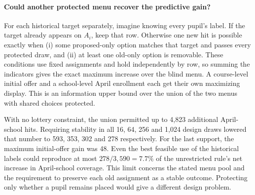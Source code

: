 \paragraph{Could another protected menu recover the predictive gain?}
For each historical target separately, imagine knowing every pupil's label. If the target already appears on $A_i$, keep that row. Otherwise one new hit is possible exactly when (i) some proposed-only option matches that target and passes every protected draw, and (ii) at least one old-only option is removable. These conditions use fixed assignments and hold independently by row, so summing the indicators gives the exact maximum increase over the blind menu. A course-level initial offer and a school-level April enrollment each get their own maximizing display. This is an information upper bound over the union of the two menus with shared choices protected.

With no lottery constraint, the union permitted up to 4,823 additional April-school hits. Requiring stability in all 16, 64, 256 and 1,024 design draws lowered that number to 593, 353, 302 and 278 respectively. For the last support, the maximum initial-offer gain was 48. Even the best feasible use of the historical labels could reproduce at most $278/3{,}590=7.7\%$ of the unrestricted rule's net increase in April-school coverage. This limit concerns the stated menu pool and the requirement to preserve each old assignment as a stable outcome. Protecting only whether a pupil remains placed would give a different design problem.
